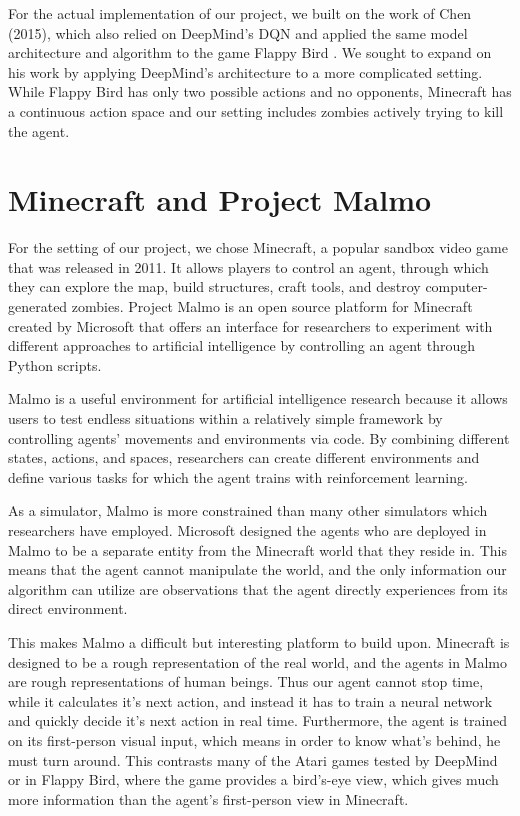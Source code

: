 \documentclass{article}
\begin{document}
\begin{multicols}{2}
For the actual implementation of our project, we built on the work of Chen (2015), which also relied on DeepMind's DQN and applied the same model architecture and algorithm to the game Flappy Bird \cite{flappyBird}.
We sought to expand on his work by applying DeepMind's architecture to a more complicated setting.
While Flappy Bird has only two possible actions and no opponents, Minecraft has a continuous action space and our setting includes zombies actively trying to kill the agent.




\section{Minecraft and Project Malmo}

For the setting of our project, we chose Minecraft, a popular sandbox video game that was released in 2011. It allows players to control an agent, through which they can explore the map, build structures, craft tools, and destroy computer-generated zombies.
Project Malmo is an open source platform for Minecraft created by Microsoft that offers an interface for researchers to experiment with different approaches to artificial intelligence by controlling an agent through Python scripts.

Malmo is a useful environment for artificial intelligence research because it allows users to test endless situations within a relatively simple framework by controlling agents' movements and environments via code. By combining different states, actions, and spaces, researchers can create different environments and define various tasks for which the agent trains with reinforcement learning.

As a simulator, Malmo is more constrained than many other simulators which researchers have employed. Microsoft designed the agents who are deployed in Malmo to be a separate entity from the Minecraft world that they reside in. This means that the agent cannot manipulate the world, and the only information our algorithm can utilize are observations that the agent directly experiences from its direct environment. 

This makes Malmo a difficult but interesting platform to build upon. Minecraft is designed to be a rough representation of the real world, and the agents in Malmo are rough representations of human beings. Thus our agent cannot stop time, while it calculates it's next action, and instead it has to train a neural network and quickly decide it's next action in real time. Furthermore, the agent is trained on its first-person visual input, which means in order to know what's behind, he must turn around. This contrasts many of the Atari games tested by DeepMind or in Flappy Bird, where the game provides a bird's-eye view, which gives much more information than the agent's first-person view in Minecraft.





\end{multicols}
\end{document}
